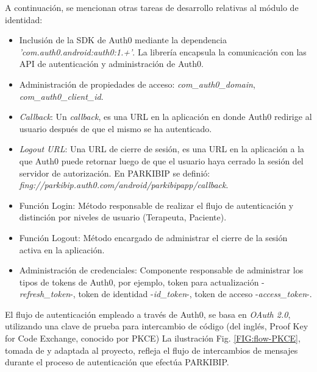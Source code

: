 A continuación, se mencionan otras tareas de desarrollo relativas al módulo de identidad:
\begin{itemize}
    \item Inclusión de la SDK de Auth0 mediante la dependencia \textit{'com.auth0.android:auth0:1.+'}. La librería encapsula la comunicación con las API de autenticación y administración de Auth0.
    \item Administración de propiedades de acceso: \textit{com\_auth0\_domain}, \textit{com\_auth0\_client\_id}.
    \item \textit{Callback}: Un \textit{callback}, es una URL en la aplicación en donde Auth0 redirige al usuario después de que el mismo se ha autenticado.
    \item \textit{Logout URL}: Una URL de cierre de sesión, es una URL en la aplicación a la que Auth0 puede retornar luego de que el usuario haya cerrado la sesión del servidor de autorización. En PARKIBIP se definió: \textit{fing://parkibip.auth0.com/android/parkibipapp/callback}.
    \item Función Login: Método responsable de realizar el flujo de autenticación y distinción por niveles de usuario (Terapeuta, Paciente).
    \item Función Logout: Método encargado de administrar el cierre de la sesión activa en la aplicación.
    \item Administración de credenciales: Componente responsable de administrar los tipos de tokens de Auth0, por ejemplo, token para actualización -\textit{refresh\_token}-, token de identidad -\textit{id\_token}-, token de acceso -\textit{access\_token}-.
\end{itemize}

El flujo de autenticación empleado a través de Auth0, se basa en \textit{OAuth 2.0}, utilizando una clave de prueba para intercambio de código (del inglés, Proof Key for Code Exchange, conocido por PKCE) La ilustración Fig. \ref{FIG:flow-PKCE}, tomada de \cite{Auth0:PKCE} y adaptada al proyecto, refleja el flujo de intercambios de mensajes durante el proceso de autenticación que efectúa PARKIBIP. 

